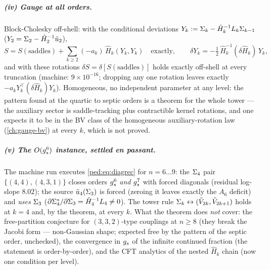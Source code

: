 \subparagraph{(iv) Gauge at all orders.} Block-Cholesky off-shell: with the conditional
deviations $Y_k:=\Sigma_k-\hat H_k^{-1}L_k\Sigma_{k-1}$ ($Y_2=\Sigma_2-\hat
H_2^{-1}\tilde u_2$),
\begin{equation}
	S = S(\text{saddles})+\sum_{k\ge2}(-a_k)\,\hat H_k(Y_k,Y_k)
	\quad\text{exactly},\qquad
	\delta Y_k = -\tfrac12\,\hat H_k^{-1}(\delta\hat H_k)\,Y_k,
	\label{ped:eq:dYall}
\end{equation}
and with these rotations $\delta S=\delta[S(\text{saddles})]$ holds exactly off-shell
at every truncation (machine: $9\times10^{-16}$; dropping any one rotation leaves
exactly $-a_kY_k^\top(\delta\hat H_k)Y_k$). Homogeneous, no independent parameter at
any level: the pattern found at the quartic to septic orders is a theorem for the whole
tower --- the auxiliary sector is saddle-tracking plus contractible kernel rotations, and
one expects it to be in the BV class of the homogeneous auxiliary-rotation law
(\cref{ch:gauge-bv}) at every $k$, which is not proved.

\subparagraph{(v) The $O(g_s^6)$ instance, settled en passant.} The machine run executes
\eqref{ped:eq:diagrec} for $n=6\dots9$: the $\Sigma_4$ pair $\{(4,4),(4,3,1)\}$ closes
orders $g_s^6$ \emph{and} $g_s^7$ with forced diagonals (residual log-slope $8.02$);
the source $\tilde u_4(\Sigma_3)$ is forced (zeroing it leaves exactly the $A_6$
deficit) and \emph{uses} $\Sigma_3$
($\partial\Sigma_4^*/\partial\Sigma_3=\hat H_4^{-1}L_4\neq0$). The tower rule
$\Sigma_k\leftrightarrow(\tilde V_{2k},\tilde V_{2k+1})$ holds at $k=4$ and, by the
theorem, at every $k$. What the theorem does \emph{not} cover: the free-partition
conjecture for $(3,3,2)$-type couplings at $n\ge8$ (they break the Jacobi form ---
non-Gaussian shape; expected free by the pattern of the septic order, unchecked), the
convergence in $g_s$ of the infinite continued fraction (the statement is order-by-order),
and the CFT analytics of the nested $\hat H_k$ chain (now one condition per level).

